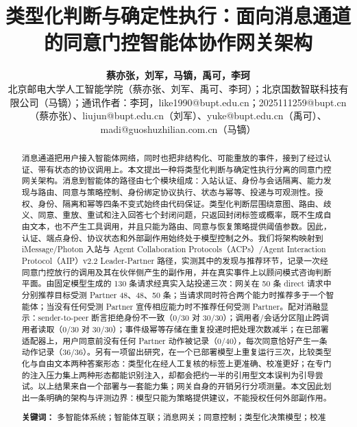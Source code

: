 \documentclass[11pt,a4paper]{article}
\begin{document}
\title{类型化判断与确定性执行：面向消息通道的同意门控智能体协作网关架构}

\author{\parbox{\dimexpr\textwidth-2\tabcolsep\relax}{\centering \textbf{蔡亦张，刘军，马镝，禹可，李珂}\\[0.4em]\small 北京邮电大学人工智能学院（蔡亦张、刘军、禹可、李珂）；北京国数智联科技有限公司（马镝）；通讯作者：李珂，like1990@bupt.edu.cn；2025111259@bupt.cn（蔡亦张）、liujun@bupt.edu.cn（刘军）、yuke@bupt.edu.cn（禹可）、madi@guoshuzhilian.com.cn（马镝）}}

\date{}

\maketitle

\begin{abstract}

消息通道把用户接入智能体网络，同时也把非结构化、可能重放的事件，接到了经过认证、带有状态的协议调用上。本文提出一种将类型化判断与确定性执行分离的同意门控网关架构。消息到智能体的路径由七个模块组成：入站认证、身份与会话隔离、能力发现与路由、同意与策略控制、身份绑定协议执行、状态与幂等、投递与可观测性。授权、身份、隔离和幂等四条不变式始终由代码保证。类型化判断层围绕意图、路由、歧义、同意、重放、重试和注入回答七个封闭问题，只返回封闭标签或概率，既不生成自由文本，也不产生工具调用，并且只能为路由、同意与恢复策略提供阈值参数。因此，认证、端点身份、协议状态和外部副作用始终处于模型控制之外。我们将架构映射到 iMessage/Photon 入站与 Agent Collaboration Protocols（ACPs）/Agent Interaction Protocol（AIP）v2.2 Leader-Partner 路径，实测其中的发现与推荐环节，记录一次经同意门控放行的调用及其在伙伴侧产生的副作用，并在真实事件上以顾问模式咨询判断平面。由固定模型生成的 130 条请求经真实入站投递三次：网关在 50 条 direct 请求中分别推荐目标受测 Partner 48、48、50 条；当请求同时符合两个能力时推荐多于一个智能体；当没有任何受测 Partner 宣传相应能力时不推荐任何受测 Partner。配对消融显示：sender-to-peer 断言拒绝身份不一致（0/30 对 30/30）；调用者/会话分区阻止跨调用者读取（0/30 对 30/30）；事件级幂等存储在重复投递时把处理次数减半；在已部署适配器上，用户同意前没有任何 Partner 动作被记录（0/40），每次同意恰好产生一条动作记录（36/36）。另有一项留出研究，在一个已部署模型上重复运行三次，比较类型化与自由文本两种答案形态：类型化在经人工复核的标签上更准确、校准更好；在专门的注入压力集上两种形态都能识别注入，却都会把约一半的引用型文本误判为引导尝试。以上结果来自一个部署与一套能力集；网关自身的开销另行分项测量。本文因此划出一条明确的架构与评测边界：模型只能为策略提供建议，不能授权任何外部副作用。

\par\medskip\noindent\textbf{关键词：} 多智能体系统；智能体互联；消息网关；同意控制；类型化决策模型；校准

\end{abstract}
\end{document}
